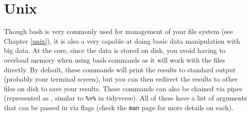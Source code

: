 \documentclass[
]{book}
\begin{document}
\hypertarget{big-data-unix}{%
\section{Unix}\label{big-data-unix}}

Though bash is very commonly used for management of your file system (see Chapter \ref{unix}), it is also a very capable at doing basic data manipulation with big data. At the core, since the data is stored on disk, you avoid having to overload memory when using bash commands as it will work with the files directly. By default, these commands will print the results to standard output (probably your terminal screen), but you can then redirect the results to other files on disk to save your results. These commands can also be chained via pipes (represented as \texttt{\textbar{}}, similar to \texttt{\%\textgreater{}\%} in tidyverse). All of these have a list of arguments that can be passed in via flags (check the \texttt{man} page for more details on each).
\end{document}
